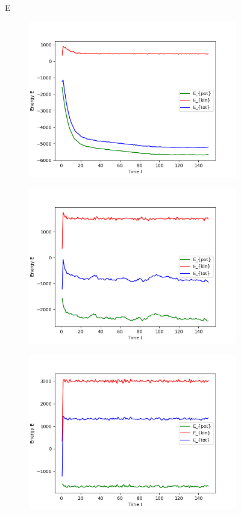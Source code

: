\begin{figure}[ht]
E
\hfill
\begin{subfigure}{0.3\textwidth}
\includegraphics[width=\textwidth]{../dat/Energies_T0d3.png}
\end{subfigure}
\hfill
\begin{subfigure}{0.3\textwidth}
\includegraphics[width=\textwidth]{../dat/Energies_T1d0.png}
\end{subfigure}
\hfill
\begin{subfigure}{0.3\textwidth}
\includegraphics[width=\textwidth]{../dat/Energies_T2d0.png}

\end{subfigure}
\end{figure}
